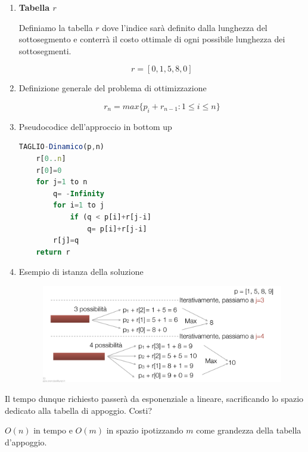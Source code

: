 \documentclass{article}
\begin{document}
\begin{enumerate}

\item \textbf{Tabella $r$}

Definiamo la tabella $r$ dove l'indice sarà definito dalla lunghezza del sottosegmento e conterrà il costo ottimale di ogni possibile lunghezza dei sottosegmenti.

\begin{equation}
    r=[0,1,5,8,0]
\end{equation}

\item Definizione generale del problema di ottimizzazione

\begin{equation}
    r_{n} = max \{ p_{i} + r_{n-1} : 1 \leq i \leq n \}
\end{equation}

\item Pseudocodice dell'approccio in bottom up

\begin{lstlisting}[language=JavaScript]
TAGLIO-Dinamico(p,n)
    r[0..n]
    r[0]=0
    for j=1 to n
        q= -Infinity
        for i=1 to j
            if (q < p[i]+r[j-i]
                q= p[i]+r[j-i]
        r[j]=q
    return r
\end{lstlisting}

\item Esempio di istanza della soluzione

\begin{figure}[htbp]
        \center
        \includegraphics[scale=0.35]{img/rodCutting3.png}
    \end{figure}

\end{enumerate}

Il tempo dunque richiesto passerà da esponenziale a lineare, sacrificando lo spazio dedicato alla tabella di appoggio. Costi?

$O(n)$ in tempo e $O(m)$ in spazio ipotizzando $m$ come grandezza della tabella d'appoggio.
\end{document}
